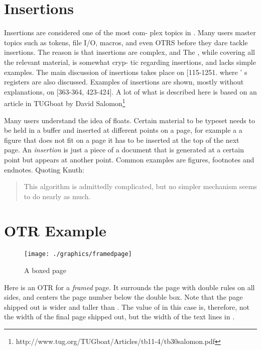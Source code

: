 


\section{Insertions}
Insertions are considered one of  the most  com- 
plex  topics in \tex. Many users master  topics  such 
as tokens,  file  I/O, macros,  and  even  OTRS  before 
they dare  tackle  insertions.  The  reason  is  that 
insertions  are  complex,  and  The \texbook, while 
covering all the relevant material, is somewhat cryp- 
tic regarding  insertions, and  lacks  simple examples. 
The  main  discussion  of  insertions takes  place  on 
[115-1251.  where \tex' s  registers  are also discussed. 
Examples  of  insertions are  shown, mostly  without 
explanations,  on  [363-364,  423-424].  A lot of what is described here is based on an article in TUGboat by David Salomon\footnote{ 
http://www.tug.org/TUGboat/Articles/tb11-4/tb30salomon.pdf}

Many users understand the idea of floats. Certain material to be typeset needs to be held in a buffer and inserted at different points on a page, for example a a figure that does not fit on a page it has to be inserted at the top of the next page. An \textit{insertion} is just a piece of a document that is generated at a certain point but appears at another point. Common examples are figures, footnotes and endnotes. Quoting Knuth:

\begin{quote}
  This  algorithm  is  admittedly  complicated, 
but  no  simpler  mechanism  seems  to  do  nearly 
as  much.
\end{quote}

\section{OTR Example}

\begin{figure}%
 \centering
  \texttt{[image: ./graphics/framedpage]}
  \caption{A boxed page}
  \label{fig:framedpage}
\end{figure}

Here is an OTR for a \textit{framed} page. It surrounds the
page with double rules on all sides, and centers the
page number below the double box. Note that the
page shipped out is wider and taller than .
The value of  in this case is, therefore, not
the width of the final page shipped out, but the
width of the text lines in .


